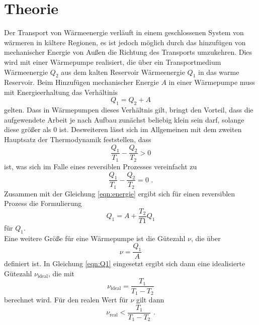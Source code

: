 \section{Theorie \cite{V206}}
\label{sec:Theorie}

Der Transport von Wärmeenergie verläuft in einem geschlossenen System von wärmeren in kältere Regionen, es ist jedoch möglich
durch das hinzufügen von mechanischer Energie von Außen die Richtung des Transports umzukehren. Dies wird mit einer 
Wärmepumpe realisiert, die über ein Transportmedium Wärmeenergie $Q_2$ aus dem kalten Reservoir Wärmeenergie $Q_1$ in das 
warme Reservoir. Beim Hinzufügen mechanischer Energie $A$ in einer Wärmepumpe muss mit Energieerhaltung das Verhältinis
\begin{equation}
    Q_1=Q_2+A
    \label{eqn:energie}
\end{equation}
gelten. Dass in Wärmepumpen dieses Verhältnis gilt, bringt den Vorteil, dass die aufgewendete Arbeit je nach Aufbau zunächst beliebig
klein sein darf, solange diese größer als 0 ist.
Desweiteren lässt sich im Allgemeinen mit dem zweiten Hauptsatz der Thermodynamik feststellen, dass
\begin{equation}
    \frac{Q_1}{T_1}-\frac{Q_2}{T_2}>0
\end{equation}
ist, was sich im Falle eines reversiblen Prozesses vereinfacht zu
\begin{equation}
    \frac{Q_1}{T_1}-\frac{Q_2}{T_2}=0 \text{ .}
\end{equation}
Zusammen mit der Gleichung \ref{eqn:energie} ergibt sich für einen reversiblen Prozess die Formulierung
\begin{equation}
    Q_1=A+\frac{T_2}{T1}Q_1
    \label{eqn:Q1}
\end{equation}
für $Q_1$.\\
\noindent Eine weitere Größe für eine Wärmepumpe ist die Gütezahl $\nu$, die über
\begin{equation}
    \nu=\frac{Q_1}{A}
    \label{eqn:güte}
\end{equation}
definiert ist. In Gleichung \ref{eqn:Q1} eingesetzt ergibt sich dann eine idealisierte Gütezahl $\nu_{\mathrm{ideal}}$, die mit
\begin{equation}
    \nu_{\mathrm{ideal}}=\frac{T_1}{T_1-T_2}
    \label{eqn:güteideal}
\end{equation}
berechnet wird. Für den realen Wert für $\nu$ gilt dann
\begin{equation}
    \nu_{\mathrm{real}}<\frac{T_1}{T_1-T_2} \text{ .}
\end{equation}
